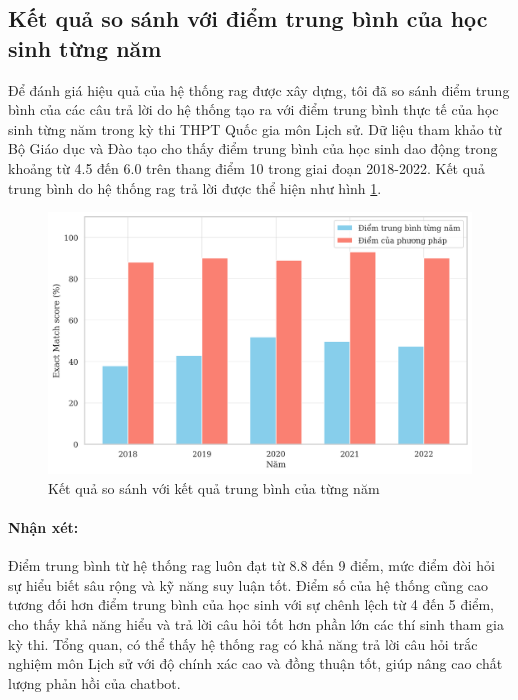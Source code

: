\subsection{Kết quả so sánh với điểm trung bình của học sinh từng năm
}
Để đánh giá hiệu quả của hệ thống \gls{rag} được xây dựng, tôi đã so sánh điểm trung bình của các câu trả lời do hệ thống tạo ra với điểm trung bình thực tế của học sinh từng năm trong kỳ thi THPT Quốc gia môn Lịch sử. Dữ liệu tham khảo từ Bộ Giáo dục và Đào tạo cho thấy điểm trung bình của học sinh dao động trong khoảng từ 4.5 đến 6.0 trên thang điểm 10 trong giai đoạn 2018-2022. Kết quả trung bình do hệ thống \gls{rag} trả lời được thể hiện như hình \ref{fig:evaluation}.
\begin{figure}
    \centering
    \includegraphics[width=1\textwidth]{Chapter4/Fig/compare_with_average.png}
    \caption{Kết quả so sánh với kết quả trung bình của từng năm}
    \label{fig:evaluation}
\end{figure}


\paragraph{Nhận xét:}


Điểm trung bình từ hệ thống \gls{rag} luôn đạt từ 8.8 đến 9 điểm, mức điểm đòi hỏi sự hiểu biết sâu rộng và kỹ năng suy luận tốt. Điểm số của hệ thống cũng cao tương đối hơn điểm trung bình của học sinh với sự chênh lệch từ 4 đến 5 điểm, cho thấy khả năng hiểu và trả lời câu hỏi tốt hơn phần lớn các thí sinh tham gia kỳ thi. Tổng quan, có thể thấy hệ thống \gls{rag} có khả năng trả lời câu hỏi trắc nghiệm môn Lịch sử với độ chính xác cao và đồng thuận tốt, giúp nâng cao chất lượng phản hồi của chatbot.



